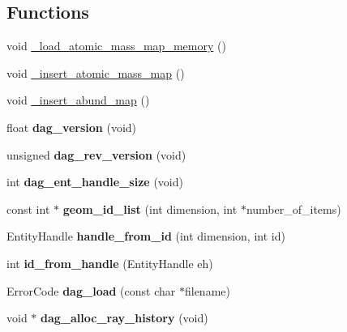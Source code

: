 \subsection*{Functions}
\begin{DoxyCompactItemize}
\item 
void \hyperlink{namespacepyne_a17db902268741d241fcc9d57ff7eef13}{\+\_\+load\+\_\+atomic\+\_\+mass\+\_\+map\+\_\+memory} ()
\item 
void \hyperlink{namespacepyne_a7deefcb42d075c174f1cf4f196246cce}{\+\_\+insert\+\_\+atomic\+\_\+mass\+\_\+map} ()
\item 
void \hyperlink{namespacepyne_a6acc3972fa6eeb9761f4c858af078529}{\+\_\+insert\+\_\+abund\+\_\+map} ()
\item 
\mbox{\label{namespacepyne_a2213248fb59d53de02ff3317321f35a1}} 
float {\bfseries dag\+\_\+version} (void)
\item 
\mbox{\label{namespacepyne_a3a4f252b82e4290ee8c9e82a8db38da6}} 
unsigned {\bfseries dag\+\_\+rev\+\_\+version} (void)
\item 
\mbox{\label{namespacepyne_a258aedf1cd43d592c20dc7527db14fc1}} 
int {\bfseries dag\+\_\+ent\+\_\+handle\+\_\+size} (void)
\item 
\mbox{\label{namespacepyne_a947c94bdefb6541c33439817b5293ef9}} 
const int $\ast$ {\bfseries geom\+\_\+id\+\_\+list} (int dimension, int $\ast$number\+\_\+of\+\_\+items)
\item 
\mbox{\label{namespacepyne_a793858138da0f88a32c4b03401bef215}} 
Entity\+Handle {\bfseries handle\+\_\+from\+\_\+id} (int dimension, int id)
\item 
\mbox{\label{namespacepyne_ac13399f54545bd88502c3cb7e2fae4c3}} 
int {\bfseries id\+\_\+from\+\_\+handle} (Entity\+Handle eh)
\item 
\mbox{\label{namespacepyne_ae29cb4ffcd3fea6fbb2b6418cdb0b42d}} 
Error\+Code {\bfseries dag\+\_\+load} (const char $\ast$filename)
\item 
\mbox{\label{namespacepyne_afa68eb50ccf4aa327937219dd3c05e02}} 
void $\ast$ {\bfseries dag\+\_\+alloc\+\_\+ray\+\_\+history} (void)

\end{DoxyCompactItemize}
